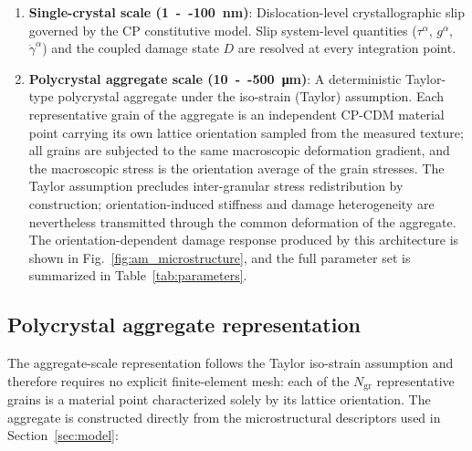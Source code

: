 \documentclass[twocolumn]{sagej}
\begin{document}
\begin{enumerate}\def\labelenumi{\textbf{Scale \arabic{enumi}}:}
    \item \textbf{Single-crystal scale (\SI{1}{--}\SI{100}{\nano\meter})}: Dislocation-level crystallographic slip governed by the CP constitutive model. Slip system-level quantities ($\tau^\alpha$, $g^\alpha$, $\dot{\gamma}^\alpha$) and the coupled damage state $D$ are resolved at every integration point.
    
    \item \textbf{Polycrystal aggregate scale (\SI{10}{--}\SI{500}{\micro\meter})}: A deterministic Taylor-type polycrystal aggregate under the iso-strain (Taylor) assumption. Each representative grain of the aggregate is an independent CP-CDM material point carrying its own lattice orientation sampled from the measured texture; all grains are subjected to the same macroscopic deformation gradient, and the macroscopic stress is the orientation average of the grain stresses. The Taylor assumption precludes inter-granular stress redistribution by construction; orientation-induced stiffness and damage heterogeneity are nevertheless transmitted through the common deformation of the aggregate. The orientation-dependent damage response produced by this architecture is shown in Fig.~\ref{fig:am_microstructure}, and the full parameter set is summarized in Table~\ref{tab:parameters}.
\end{enumerate}

\subsection{Polycrystal aggregate representation}

The aggregate-scale representation follows the Taylor iso-strain assumption and therefore requires no explicit finite-element mesh: each of the $N_{\text{gr}}$ representative grains is a material point characterized solely by its lattice orientation. The aggregate is constructed directly from the microstructural descriptors used in Section~\ref{sec:model}:
\end{document}
